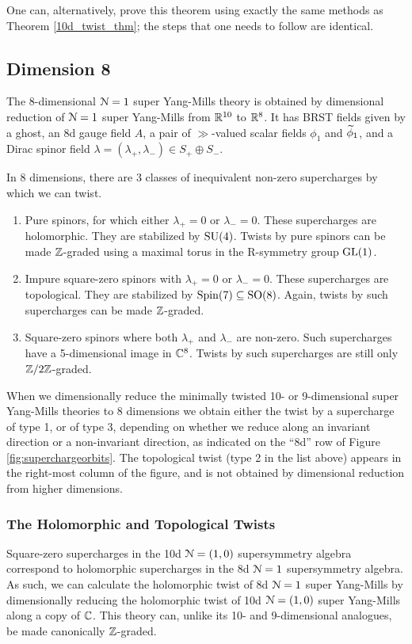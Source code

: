 \documentclass[10pt, oneside]{article}
\begin{document}
\begin{remark}
One can, alternatively, prove this theorem using exactly the same methods as Theorem \ref{10d_twist_thm}; the steps that one needs to follow are identical.
\end{remark}

\subsection{Dimension 8}
The 8-dimensional $\mathcal{N}=1$ super Yang-Mills theory is obtained by dimensional reduction of $\mathcal{N}=1$ super Yang-Mills from $\mathbb R^{10}$ to $\mathbb R^8$.  It has BRST fields given by a ghost, an 8d gauge field $A$, a pair of $\gg$-valued scalar fields $\phi_1$ and $\widetilde{\phi}_1$, and a Dirac spinor field $\lambda = (\lambda_+, \lambda_-) \in S_+ \oplus S_-$.

In 8 dimensions, there are 3 classes of inequivalent non-zero supercharges by which we can twist.
\begin{enumerate}
 \item Pure spinors, for which either $\lambda_+ = 0$ or $\lambda_- = 0$.  These supercharges are holomorphic.  They are stabilized by $\mathrm{SU}(4)$.  Twists by pure spinors can be made $\mathbb Z$-graded using a maximal torus in the R-symmetry group $\mathrm{GL}(1)$.
 \item Impure square-zero spinors with $\lambda_+ = 0$ or $\lambda_- = 0$.  These supercharges are topological.  They are stabilized by $\mathrm{Spin}(7) \subseteq \mathrm{SO}(8)$.  Again, twists by such supercharges can be made $\mathbb Z$-graded.
 \item Square-zero spinors where both $\lambda_+$ and $\lambda_-$ are non-zero.  Such supercharges have a 5-dimensional image in $\mathbb C^8$.  Twists by such supercharges are still only $\mathbb Z/2\mathbb Z$-graded.
\end{enumerate}

When we dimensionally reduce the minimally twisted 10- or 9-dimensional super Yang-Mills theories to 8 dimensions we obtain either the twist by a supercharge of type 1, or of type 3, depending on whether we reduce along an invariant direction or a non-invariant direction, as indicated on the ``8d'' row of Figure \ref{fig:superchargeorbits}.  The topological twist (type 2 in the list above) appears in the right-most column of the figure, and is not obtained by dimensional reduction from higher dimensions.

\subsubsection{The Holomorphic and Topological Twists}
Square-zero supercharges in the 10d $\mathcal{N}=(1,0)$ supersymmetry algebra correspond to holomorphic supercharges in the 8d $\mathcal{N}=1$ supersymmetry algebra.  As such, we can calculate the holomorphic twist of 8d $\mathcal{N}=1$ super Yang-Mills by dimensionally reducing the holomorphic twist of 10d $\mathcal{N}=(1,0)$ super Yang-Mills along a copy of $\mathbb C$.  This theory can, unlike its 10- and 9-dimensional analogues, be made canonically $\mathbb Z$-graded.
\end{document}

